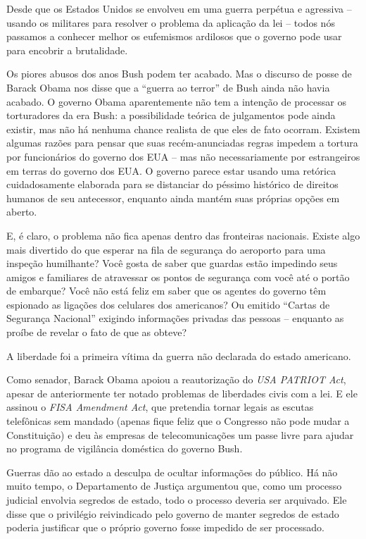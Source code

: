 Desde que os Estados Unidos se envolveu em uma guerra perpétua e agressiva -- usando os militares para resolver o problema da aplicação da lei -- todos nós passamos a conhecer melhor os eufemismos ardilosos que o governo pode usar para encobrir a brutalidade.

Os piores abusos dos anos Bush podem ter acabado. Mas o discurso de posse de Barack Obama nos disse que a ``guerra ao terror'' de Bush ainda não havia acabado. O governo Obama aparentemente não tem a intenção de processar os torturadores da era Bush: a possibilidade teórica de julgamentos pode ainda existir, mas não há nenhuma chance realista de que eles de fato ocorram. Existem algumas razões para pensar que suas recém-anunciadas regras impedem a tortura por funcionários do governo dos EUA -- mas não necessariamente por estrangeiros em terras do governo dos EUA. O governo parece estar usando uma retórica cuidadosamente elaborada para se distanciar do péssimo histórico de direitos humanos de seu antecessor, enquanto ainda mantém suas próprias opções em aberto. 

E, é claro, o problema não fica apenas dentro das fronteiras nacionais. Existe algo mais divertido do que esperar na fila de segurança do aeroporto para uma inspeção humilhante? Você gosta de saber que guardas estão impedindo seus amigos e familiares de atravessar os pontos de segurança com você até o portão de embarque? Você não está feliz em saber que os agentes do governo têm espionado as ligações dos celulares dos americanos? Ou emitido ``Cartas de Segurança Nacional'' exigindo informações privadas das pessoas -- enquanto as proíbe de revelar o fato de que as obteve?

A liberdade foi a primeira vítima da guerra não declarada do estado americano.

Como senador, Barack Obama apoiou a reautorização do \emph{USA PATRIOT Act}, apesar de anteriormente ter notado problemas de liberdades civis com a lei. E ele assinou o \emph{FISA Amendment Act}, que pretendia tornar legais as escutas telefônicas sem mandado (apenas fique feliz que o Congresso não pode mudar a Constituição) e deu às empresas de telecomunicações um passe livre para ajudar no programa de vigilância doméstica do governo Bush.

Guerras dão ao estado a desculpa de ocultar informações do público. Há não muito tempo, o Departamento de Justiça argumentou que, como um processo judicial envolvia segredos de estado, todo o processo deveria ser arquivado. Ele disse que o privilégio reivindicado pelo governo de manter segredos de estado poderia justificar que o próprio governo fosse impedido de ser processado.

